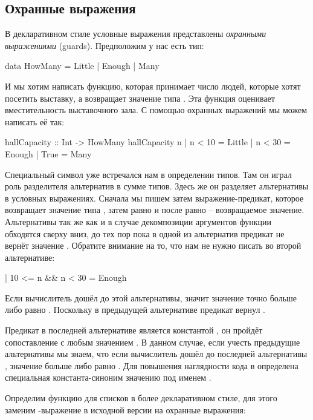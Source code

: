 \subsection{Охранные выражения}

В декларативном стиле условные выражения представлены \emph{охранными
выражениями} (guards). Предположим у нас есть тип:


\begin{code}
data HowMany = Little | Enough | Many
\end{code}

И мы хотим написать функцию, которая принимает число людей, которые
хотят посетить выставку, а возвращает значение типа . Эта
функция оценивает вместительность выставочного зала. С помощью охранных
выражений мы можем написать её так:


\begin{code}
hallCapacity :: Int -> HowMany
hallCapacity n
    | n < 10    = Little
    | n < 30    = Enough
    | True      = Many
\end{code}

Специальный символ \In{|} уже встречался нам в определении типов. Там он
играл роль разделителя альтернатив в сумме типов. Здесь же он разделяет
альтернативы в условных выражениях. Сначала мы пишем \In{|} затем
выражение-предикат, которое возвращает значение типа , затем
равно и после равно -- возвращаемое значение. Альтернативы так же как и
в случае декомпозиции аргументов функции обходятся сверху вниз, до тех
пор пока в одной из альтернатив предикат не вернёт значение .
Обратите внимание на то, что нам не нужно писать во второй альтернативе:


\begin{code}
    | 10 <= n && n < 30   = Enough
\end{code}

Если вычислитель дошёл до этой альтернативы, значит значение точно
больше либо равно . Поскольку в предыдущей альтернативе предикат
вернул .

Предикат в последней альтернативе является константой , он
пройдёт сопоставление с любым значением . В данном случае, если
учесть предыдущие альтернативы мы знаем, что если вычислитель дошёл до
последней альтернативы , значение  больше либо равно . Для
повышения наглядности кода в  определена специальная
константа-синоним значению  под именем .

Определим функцию  для списков в более декларативном стиле,
для этого заменим -выражение в исходной версии на охранные
выражения:


